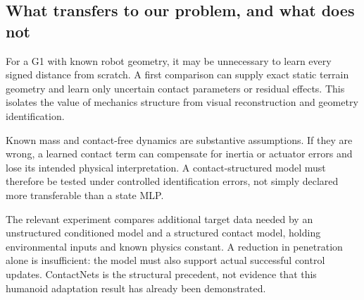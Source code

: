 \subsection{What transfers to our problem, and what does not}
For a G1 with known robot geometry, it may be unnecessary to learn every signed
distance from scratch. A first comparison can supply exact static terrain
geometry and learn only uncertain contact parameters or residual effects. This
isolates the value of mechanics structure from visual reconstruction and
geometry identification.

Known mass and contact-free dynamics are substantive assumptions. If they are
wrong, a learned contact term can compensate for inertia or actuator errors and
lose its intended physical interpretation. A contact-structured model must
therefore be tested under controlled identification errors, not simply declared
more transferable than a state MLP.

The relevant experiment compares additional target data needed by an unstructured
conditioned model and a structured contact model, holding environmental inputs
and known physics constant. A reduction in penetration alone is insufficient:
the model must also support actual successful control updates. ContactNets is
the structural precedent, not evidence that this humanoid adaptation result
has already been demonstrated.
